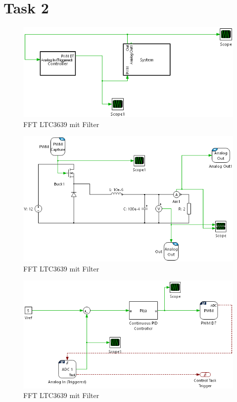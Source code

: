 \section{Task 2} \label{sec:Task2}


\begin{figure}[H]
    \centering
    \includegraphics[width=0.8\linewidth]{Figure/Hard.png}
    \caption{FFT LTC3639 mit Filter}
    \label{fig:Soft}
\end{figure}

\begin{figure}[H]
    \centering
    \includegraphics[width=0.8\linewidth]{Figure/SystemHard.png}
    \caption{FFT LTC3639 mit Filter}
    \label{fig:ControllerSoft}
\end{figure}

\begin{figure}[H]
    \centering
    \includegraphics[width=0.8\linewidth]{Figure/ControllerHard.png}
    \caption{FFT LTC3639 mit Filter}
    \label{fig:SystemSoft}
\end{figure}


